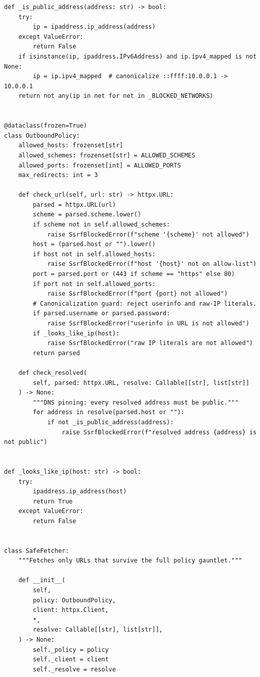 \begin{verbatim}
def _is_public_address(address: str) -> bool:
    try:
        ip = ipaddress.ip_address(address)
    except ValueError:
        return False
    if isinstance(ip, ipaddress.IPv6Address) and ip.ipv4_mapped is not None:
        ip = ip.ipv4_mapped  # canonicalize ::ffff:10.0.0.1 -> 10.0.0.1
    return not any(ip in net for net in _BLOCKED_NETWORKS)


@dataclass(frozen=True)
class OutboundPolicy:
    allowed_hosts: frozenset[str]
    allowed_schemes: frozenset[str] = ALLOWED_SCHEMES
    allowed_ports: frozenset[int] = ALLOWED_PORTS
    max_redirects: int = 3

    def check_url(self, url: str) -> httpx.URL:
        parsed = httpx.URL(url)
        scheme = parsed.scheme.lower()
        if scheme not in self.allowed_schemes:
            raise SsrfBlockedError(f"scheme '{scheme}' not allowed")
        host = (parsed.host or "").lower()
        if host not in self.allowed_hosts:
            raise SsrfBlockedError(f"host '{host}' not on allow-list")
        port = parsed.port or (443 if scheme == "https" else 80)
        if port not in self.allowed_ports:
            raise SsrfBlockedError(f"port {port} not allowed")
        # Canonicalization guard: reject userinfo and raw-IP literals.
        if parsed.username or parsed.password:
            raise SsrfBlockedError("userinfo in URL is not allowed")
        if _looks_like_ip(host):
            raise SsrfBlockedError("raw IP literals are not allowed")
        return parsed

    def check_resolved(
        self, parsed: httpx.URL, resolve: Callable[[str], list[str]]
    ) -> None:
        """DNS pinning: every resolved address must be public."""
        for address in resolve(parsed.host or ""):
            if not _is_public_address(address):
                raise SsrfBlockedError(f"resolved address {address} is not public")


def _looks_like_ip(host: str) -> bool:
    try:
        ipaddress.ip_address(host)
        return True
    except ValueError:
        return False


class SafeFetcher:
    """Fetches only URLs that survive the full policy gauntlet."""

    def __init__(
        self,
        policy: OutboundPolicy,
        client: httpx.Client,
        *,
        resolve: Callable[[str], list[str]],
    ) -> None:
        self._policy = policy
        self._client = client
        self._resolve = resolve


\end{verbatim}
